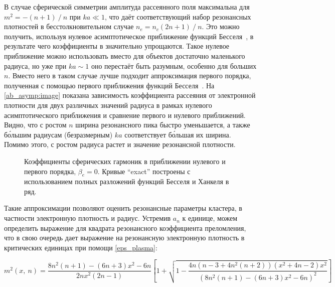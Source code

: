 
В случае сферической симметрии амплитуда рассеянного поля максимальна для $m^2 = - (n + 1)\:/\:n$ при $ka \ll 1$, что даёт соответствующий набор резонансных плотностей в бесстолкновительном случае $n_e = n_c(2n + 1)\:/\:n$. Это можно получить, используя нулевое асимптотическое приближение функций Бесселя~\cite{boren_huffman}, в результате чего коэффициенты в  значительно упрощаются. Такое нулевое приближение можно использовать вместо  для объектов достаточно маленького радиуса, но уже при $ka \sim 1$ оно перестаёт быть разумным, особенно для больших $n$. Вместо него в таком случае лучше подходит аппроксимация первого порядка, полученная с помощью первого приближения функций Бесселя~\cite{boren_huffman}. На \autoref{ab_asymp:image} показана зависимость коэффициента рассеяния от электронной плотности для двух различных значений радиуса в рамках нулевого асимптотического приближения и сравнение первого и нулевого приближений. Видно, что с ростом $n$ ширина резонансного пика быстро уменьшается, а также б\'{о}льшим радиусам (безразмерным) $ka$ соответствует б\'{о}льшая их ширина. Помимо этого, с ростом радиуса растет и значение резонансной плотности.

    \begin{figure}[htb]
        \hfil
		\caption{Коэффициенты сферических гармоник в приближении нулевого и первого порядка, $\beta_e = 0$. Кривые ``exact'' построены с использованием полных разложений функций Бесселя и Ханкеля в ряд.}\label{ab_asymp:image}
	\end{figure}


Такие аппроксимации позволяют оценить резонансные параметры кластера, в частности электронную плотность и радиус. Устремив $a_n$ к единице, можем определить выражение для квадрата резонансного коэффициента преломления, что в свою очередь дает выражение на резонансную электронную плотность в критических единицах при помощи \autoref{eps_plasma}:

    \begin{equation}
        m^2 \left(x,\:n \right) = \frac{8n^2 (n + 1) - (6n + 3)x^2 - 6n}{2n x^2 (2n-1)} \left[ 1 + \sqrt{ 1 - \frac{4n (n-3 + 4n^2 (n + 2)) (x^2 + 4n-2) x^2}{{\left(8n^2 (n + 1) - (6n + 3)x^2 - 6n \right)}^{2}} } \right]
        \label{m2_resonance}
    \end{equation}

